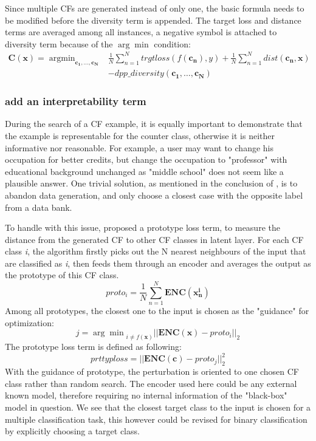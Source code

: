 Since multiple CFs are generated instead of only one, the basic formula needs to be modified before the diversity term is appended. The target loss and distance terms are averaged among all instances, a negative symbol is attached to diversity term because of the $\arg\min$ condition:
\begin{equation}\label{eq:DiCe}
\begin{split}
  \mathbf{C(x)}=\mathop{\arg\min}_{\mathbf{c_1,\dots,c_N}}&\frac{1}{N}\sum_{n=1}^{N}trgtloss(f(\mathbf{c_n}),y)
  +\frac{1}{N}\sum_{n=1}^{N}dist(\mathbf{c_n,x})
  \\&-dpp\_diversity(\mathbf{c_1,\dots,c_N})
\end{split}
\end{equation}
\subsubsection{add an interpretability term}
During the search of a CF example, it is equally important to demonstrate that the example is representable for the counter class, otherwise it is neither informative nor reasonable. For example, a user may want to change his occupation for better credits, but change the occupation to "professor" with educational background unchanged as "middle school" does not seem like a plausible answer. One trivial solution, as mentioned in the conclusion of \cite{bertossi2020asp}, is to abandon data generation, and only choose a closest case with the opposite label from a data bank.

To handle with this issue, \cite{prototype} proposed a prototype loss term, to measure the distance from the generated CF to other CF classes in latent layer. For each CF class \emph{i}, the algorithm firstly picks out the N nearest neighbours of the input that are classified as \emph{i}, then feeds them through an encoder and averages the output as the prototype of this CF class.
\begin{equation}\label{eq:prototype}
  proto_i=\frac{1}{N}\sum_{n=1}^{N}\mathbf{ENC}(\mathbf{x_n^i})
\end{equation}
Among all prototypes, the closest one to the input is chosen as the "guidance" for optimization:
\begin{equation}\label{eq:closestProto}
  j = {\arg\min}_{i\neq f(\textbf{x})}||\mathbf{ENC}(\textbf{x})-proto_i||_2
\end{equation}
The prototype loss term is defined as following:
\begin{equation}\label{eq:protoloss}
  prttyploss=||\mathbf{ENC}(\textbf{c})-proto_j||_2^2
\end{equation}
With the guidance of prototype, the perturbation is oriented to one chosen CF class rather than random search. The encoder used here could be any external known model, therefore requiring no internal information of the "black-box" model in question. We see that the closest target class to the input is chosen for a multiple classification task, this however could be revised for binary classification by explicitly choosing a target class.

